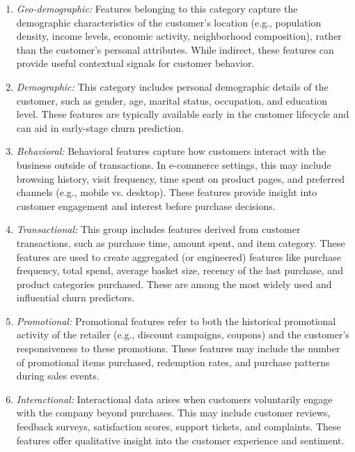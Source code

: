 \documentclass[preprint,12pt]{elsarticle}
\begin{document}
\begin{enumerate} 
\item \textit{Geo-demographic:}
Features belonging to this category capture the demographic characteristics of the customer's location (e.g., population density, income levels, economic activity, neighborhood composition), rather than the customer's personal attributes. %
While indirect, these features can provide useful contextual signals for customer behavior.

\item \textit{Demographic:}
This category includes personal demographic details of the customer, such as gender, age, marital status, occupation, and education level. These features are typically available early in the customer lifecycle and can aid in early-stage churn prediction.

\item \textit{Behavioral:}
Behavioral features capture how customers interact with the business outside of transactions. In e-commerce settings, this may include browsing history, visit frequency, time spent on product pages, and preferred channels (e.g., mobile vs. desktop). These features provide insight into customer engagement and interest before purchase decisions.

\item \textit{Transactional:}
This group includes features derived from customer transactions, such as purchase time, amount spent, and item category. These features are used to create aggregated (or engineered) features like purchase frequency, total spend, average basket size, recency of the last purchase, and product categories purchased. These are among the most widely used and influential churn predictors.

\item \textit{Promotional:}
Promotional features refer to both the historical promotional activity of the retailer (e.g., discount campaigns, coupons) and the customer's responsiveness to these promotions. These features may include the number of promotional items purchased, redemption rates, and purchase patterns during sales events.

\item \textit{Interactional:}
Interactional data arises when customers voluntarily engage with the company beyond purchases. This may include customer reviews, feedback surveys, satisfaction scores, support tickets, and complaints. These features offer qualitative insight into the customer experience and sentiment. 
\end{enumerate}
\end{document}
